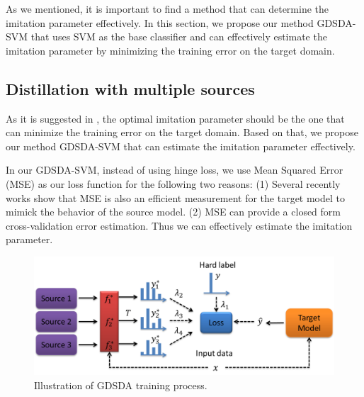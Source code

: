 As we mentioned, it is important to find a method that can determine the imitation parameter effectively. In this section, we propose our method GDSDA-SVM that uses SVM as the base classifier and can effectively estimate the imitation parameter by minimizing the training error on the target domain.
\subsection{Distillation with multiple sources}
As it is suggested in \cite{vapnik2015learning}, the optimal imitation parameter should be the one that can minimize the training error on the target domain. Based on that, we propose our method GDSDA-SVM that can estimate the imitation parameter effectively.

In our GDSDA-SVM, instead of using hinge loss, we use Mean Squared Error (MSE) as our loss function for the following two reasons: (1) Several recently works \cite{ba2014deep,luo2016face,romero2014fitnets,urban2016deep} show that MSE is also an efficient measurement for the target model to mimick the behavior of the source model. (2) MSE can provide a closed form cross-validation error estimation. Thus we can effectively estimate the imitation parameter. 

\begin{figure}\label{fig:GDSDA}
\centering
\includegraphics[scale=.3]{figure/multi-GDDA.png}
\caption{Illustration of GDSDA training process.}
\end{figure}

